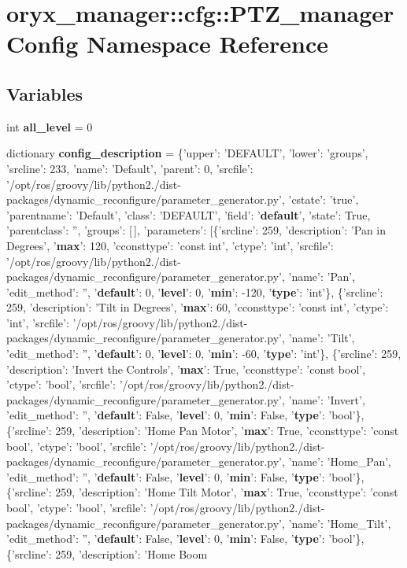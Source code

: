 \section{oryx\-\_\-manager\-:\-:cfg\-:\-:\-P\-T\-Z\-\_\-manager\-Config \-Namespace \-Reference}
\label{namespaceoryx__manager_1_1cfg_1_1PTZ__managerConfig}
\subsection*{\-Variables}
\begin{DoxyCompactItemize}
\item 
int {\bf all\-\_\-level} = 0
\item 
dictionary {\bf config\-\_\-description} = \{'upper'\-: '\-D\-E\-F\-A\-U\-L\-T', 'lower'\-: 'groups', 'srcline'\-: 233, 'name'\-: '\-Default', 'parent'\-: 0, 'srcfile'\-: '/opt/ros/groovy/lib/python2./dist-\/packages/dynamic\-\_\-reconfigure/parameter\-\_\-generator.\-py', 'cstate'\-: 'true', 'parentname'\-: '\-Default', 'class'\-: '\-D\-E\-F\-A\-U\-L\-T', 'field'\-: '{\bf default}', 'state'\-: \-True, 'parentclass'\-: '', 'groups'\-: [$\,$], 'parameters'\-: [\{'srcline'\-: 259, 'description'\-: '\-Pan in \-Degrees', '{\bf max}'\-: 120, 'cconsttype'\-: 'const int', 'ctype'\-: 'int', 'srcfile'\-: '/opt/ros/groovy/lib/python2./dist-\/packages/dynamic\-\_\-reconfigure/parameter\-\_\-generator.\-py', 'name'\-: '\-Pan', 'edit\-\_\-method'\-: '', '{\bf default}'\-: 0, '{\bf level}'\-: 0, '{\bf min}'\-: -\/120, '{\bf type}'\-: 'int'\}, \{'srcline'\-: 259, 'description'\-: '\-Tilt in \-Degrees', '{\bf max}'\-: 60, 'cconsttype'\-: 'const int', 'ctype'\-: 'int', 'srcfile'\-: '/opt/ros/groovy/lib/python2./dist-\/packages/dynamic\-\_\-reconfigure/parameter\-\_\-generator.\-py', 'name'\-: '\-Tilt', 'edit\-\_\-method'\-: '', '{\bf default}'\-: 0, '{\bf level}'\-: 0, '{\bf min}'\-: -\/60, '{\bf type}'\-: 'int'\}, \{'srcline'\-: 259, 'description'\-: '\-Invert the \-Controls', '{\bf max}'\-: \-True, 'cconsttype'\-: 'const bool', 'ctype'\-: 'bool', 'srcfile'\-: '/opt/ros/groovy/lib/python2./dist-\/packages/dynamic\-\_\-reconfigure/parameter\-\_\-generator.\-py', 'name'\-: '\-Invert', 'edit\-\_\-method'\-: '', '{\bf default}'\-: \-False, '{\bf level}'\-: 0, '{\bf min}'\-: \-False, '{\bf type}'\-: 'bool'\}, \{'srcline'\-: 259, 'description'\-: '\-Home \-Pan \-Motor', '{\bf max}'\-: \-True, 'cconsttype'\-: 'const bool', 'ctype'\-: 'bool', 'srcfile'\-: '/opt/ros/groovy/lib/python2./dist-\/packages/dynamic\-\_\-reconfigure/parameter\-\_\-generator.\-py', 'name'\-: '\-Home\-\_\-\-Pan', 'edit\-\_\-method'\-: '', '{\bf default}'\-: \-False, '{\bf level}'\-: 0, '{\bf min}'\-: \-False, '{\bf type}'\-: 'bool'\}, \{'srcline'\-: 259, 'description'\-: '\-Home \-Tilt \-Motor', '{\bf max}'\-: \-True, 'cconsttype'\-: 'const bool', 'ctype'\-: 'bool', 'srcfile'\-: '/opt/ros/groovy/lib/python2./dist-\/packages/dynamic\-\_\-reconfigure/parameter\-\_\-generator.\-py', 'name'\-: '\-Home\-\_\-\-Tilt', 'edit\-\_\-method'\-: '', '{\bf default}'\-: \-False, '{\bf level}'\-: 0, '{\bf min}'\-: \-False, '{\bf type}'\-: 'bool'\}, \{'srcline'\-: 259, 'description'\-: '\-Home \-Boom 
\end{DoxyCompactItemize}
